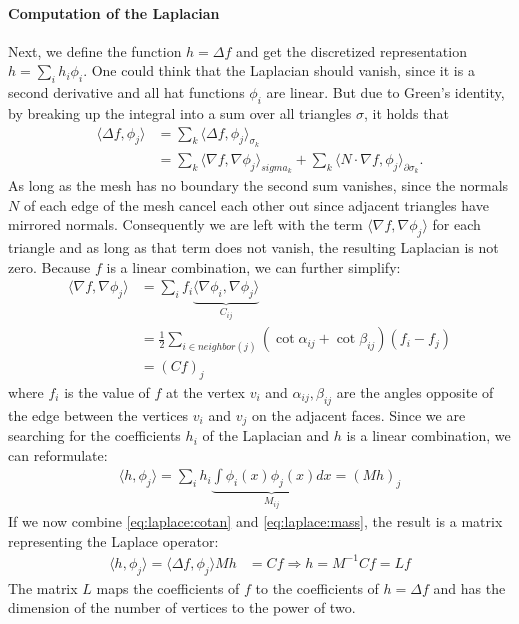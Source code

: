 \paragraph{Computation of the Laplacian}
Next, we define the function $h = \Delta f$ and get the discretized representation $h = \sum_i h_i \phi_i$.
One could think that the Laplacian should vanish, since it is a second derivative and all hat functions $\phi_i$ are linear.
But due to Green's identity, by breaking up the integral into a sum over all triangles $\sigma$, it holds that
\begin{align}
	\langle \Delta f, \phi_j \rangle &= \sum_{k} \langle \Delta f, \phi_j \rangle_{\sigma_k} \\
	&= \sum_{k} \langle \nabla f, \nabla \phi_j \rangle_{sigma_k} + \sum_{k} \langle N \cdot \nabla f, \phi_j \rangle_{\partial \sigma_k}.
\end{align}
As long as the mesh has no boundary the second sum vanishes, since the normals $N$ of each edge of the mesh cancel each other out since adjacent triangles have mirrored normals.
Consequently we are left with the term $\langle \nabla f, \nabla \phi_j \rangle$ for each triangle and as long as that term does not vanish, the resulting Laplacian is not zero.
Because $f$ is a linear combination, we can further simplify:
\begin{align}
	\langle \nabla f, \nabla \phi_j \rangle &= \sum_i f_i \underbrace{\langle \nabla \phi_i, \nabla \phi_j \rangle}_{C_{ij}} \\
	& = \frac{1}{2} \sum_{i \in neighbor(j)} (\cot \alpha_{ij} + \cot \beta_{ij})(f_i - f_j)\\
	& = (Cf)_j
	\label{eq:laplace:cotan}
\end{align}
where $f_i$ is the value of $f$ at the vertex $v_i$ and $\alpha_{ij},\beta_{ij}$ are the angles opposite of the edge between the vertices $v_i$ and $v_j$ on the adjacent faces.
Since we are searching for the coefficients $h_i$ of the Laplacian and $h$ is a linear combination, we can reformulate:
\begin{align}
	\langle h, \phi_j \rangle = \sum_i h_i \underbrace{\int \phi_i(x) \phi_j(x) dx}_{M_{ij}} = (Mh)_j
	\label{eq:laplace:mass}
\end{align}
If we now combine \eqref{eq:laplace:cotan} and \eqref{eq:laplace:mass}, the result is a matrix representing the Laplace operator:
\begin{align}
	\langle h, \phi_j \rangle = \langle \Delta f, \phi_j \rangle
	Mh &= Cf \Rightarrow h = M^{-1}Cf = Lf
	\label{eq:laplace:final}
\end{align}
The matrix $L$ maps the coefficients of $f$ to the coefficients of $h = \Delta f$ and has the dimension of the number of vertices to the power of two.

